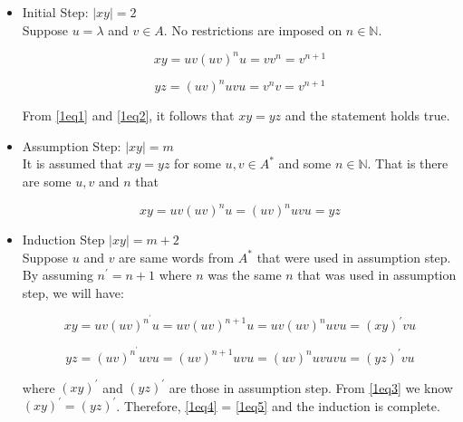 \begin{itemize}

\item
Initial Step: $|xy| = 2$\\
Suppose $u = \lambda$ and $v \in A$. No restrictions are imposed on $n \in \mathbb{N}$.

\begin{equation}\label{1eq1}
xy = uv(uv)^nu = vv^n = v^{n+1}
\end{equation}

\begin{equation}\label{1eq2}
yz = (uv)^nuvu = v^nv = v^{n+1}
\end{equation}

From \eqref{1eq1} and \eqref{1eq2}, it follows that $xy = yz$ and the statement holds true.

\item
Assumption Step: $|xy| = m$\\
It is assumed that $xy = yz$ for some $u,v \in A^*$ and some $n \in \mathbb{N}$.
That is there are some $u, v$ and $n$ that

\begin{equation}\label{1eq3}
xy = uv(uv)^nu = (uv)^nuvu = yz
\end{equation}

\item
Induction Step $|xy| = m + 2$\\
Suppose $u$ and $v$ are same words from $A^*$ that were used in assumption step.
By assuming $n^\prime = n + 1$ where $n$ was the same $n$ that was used in assumption step, we will have:

\begin{equation}\label{1eq4}
xy = uv(uv)^{n^\prime}u = uv(uv)^{n+1}u = uv(uv)^nuvu = (xy)^\prime vu
\end{equation}

\begin{equation}\label{1eq5}
yz = (uv)^{n^\prime}uvu = (uv)^{n+1}uvu = (uv)^nuvuvu = (yz)^\prime vu
\end{equation}

where $(xy)^\prime$ and $(yz)^\prime$ are those in assumption step.
From \eqref{1eq3} we know $(xy)^\prime = (yz)^\prime$. Therefore, \eqref{1eq4} = \eqref{1eq5} and the induction is complete.

\end{itemize}
